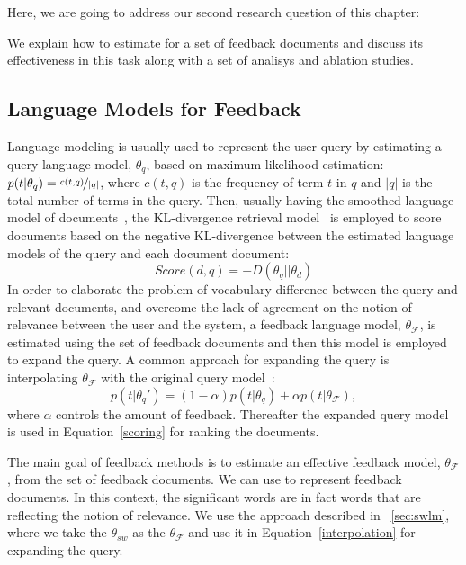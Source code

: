 Here, we are going to address our second research question of this chapter: 

We explain how to estimate \acswlm for a set of feedback documents and discuss its effectiveness in this task along with a set of analisys and ablation studies.

\subsection{Language Models for Feedback}
Language modeling is usually used to represent the user query by estimating a query language model, $\theta_q$, based on maximum likelihood estimation:
$p(t|\theta_q)=\nicefrac{c(t,q)}{|q|}$, 
where $c(t,q)$ is the frequency of term $t$ in $q$ and $|q|$ is the total number of terms in the query.
Then, usually having the smoothed language model of documents~\citep{Zhai:2001}, the KL-divergence retrieval model~\citep{Lafferty:2001} is employed to score documents based on the negative KL-divergence between the estimated language models of the query and each document document:
\begin{equation}
Score(d,q) = -D(\theta_q||\theta_d)
\label{scoring}
\end{equation}
In order to elaborate the problem of vocabulary difference between the query and relevant documents, and overcome the lack of agreement on the notion of relevance between the user and the system, a feedback language model, $\theta_\mathcal{F}$,  is estimated using the set of feedback documents and then this model is employed to expand the query. A common approach for expanding the query is interpolating $\theta_\mathcal{F}$ with the original query model~\cite{Zhai:SMM:2001,Abdul-jaleel:2004}:
\begin{equation}
p(t|\theta_{q}') = (1-\alpha)p(t|\theta_q)+\alpha p(t|\theta_\mathcal{F}),
\label{interpolation}
\end{equation}
where $\alpha$ controls the amount of feedback. Thereafter the expanded query model is used in Equation~\ref{scoring} for ranking the documents.

The main goal of feedback methods is to estimate an effective feedback model, $\theta_\mathcal{F}$, from the set of feedback documents. 
We can use \swlms to represent feedback documents. In this context, the significant words are in fact words that are reflecting the notion of relevance. We use the approach described in ~\ref{sec:swlm}, where we take the $\theta_{sw}$ as the $\theta_\mathcal{F}$  and use it in Equation~\ref{interpolation} for expanding the query. 

